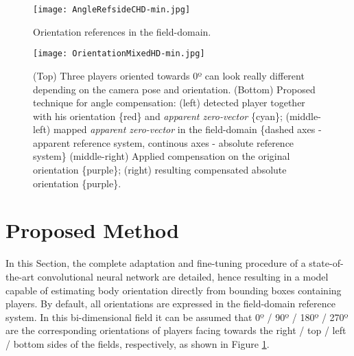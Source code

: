 \documentclass{article}
\begin{document}
\begin{figure}
\begin{center}
  \texttt{[image: AngleRefsideCHD-min.jpg]}
  \caption{Orientation references in the field-domain.}
  \label{fig:ref2}
 \end{center}
\end{figure}

\begin{figure*}
\begin{center}
  \texttt{[image: OrientationMixedHD-min.jpg]}
  \caption{(Top) Three players oriented towards 0º can look really different depending on the camera pose and orientation. (Bottom) Proposed technique for angle compensation: (left) detected player together with his orientation \{red\} and \textit{apparent zero-vector} \{cyan\}; (middle-left) mapped  \textit{apparent zero-vector} in the field-domain \{dashed axes - apparent reference system, continous axes - absolute reference system\} (middle-right) Applied compensation on the original orientation \{purple\}; (right) resulting compensated absolute orientation \{purple\}. }
  \label{fig:angCompAx}
 \end{center}
\end{figure*}

\section{Proposed Method} \label{sec:prop}
In this Section, the complete adaptation and fine-tuning procedure of a state-of-the-art convolutional neural network are detailed, hence resulting in a model capable of estimating body orientation directly from bounding boxes containing players. By default, all orientations are expressed in the field-domain reference system. In this bi-dimensional field it can be assumed that 0º / 90º / 180º / 270º are the corresponding orientations of players facing towards the right / top / left / bottom sides of the fields, respectively, as shown in Figure \ref{fig:ref2}. %
\end{document}
